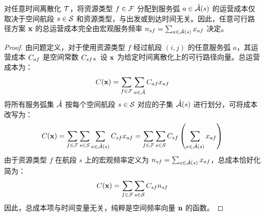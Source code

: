 \begin{lemma}
\label{lem:time_invariance_cost}
对任意时间离散化 $\mathcal{T}$，将资源类型 $f \in \mathcal{F}$ 分配到服务弧 $a \in \hat{\mathcal{A}}(s)$ 的运营成本仅取决于空间航段 $s \in \mathcal{S}$ 和资源类型，与出发或到达时间无关。因此，任意可行路径方案 $\mathbf{x}$ 的总运营成本完全由宏观服务频率 $n_{sf} = \sum_{a \in \hat{\mathcal{A}}(s)} x_{af}$ 决定。
\end{lemma}

\begin{proof}
由问题定义，对于使用资源类型 $f$ 经过航段 $(i,j)$ 的任意服务弧 $a$，其运营成本 $C_{af}$ 是空间常数 $C_{sf}$。设 $\mathbf{x}$ 为给定时间离散化上的可行路径向量。总运营成本为：
\begin{equation*}
    C(\mathbf{x}) = \sum_{f \in \mathcal{F}} \sum_{a \in \hat{\mathcal{A}}} C_{af} x_{af}
\end{equation*}
将所有服务弧集 $\hat{\mathcal{A}}$ 按每个空间航段 $s \in \mathcal{S}$ 对应的子集 $\hat{\mathcal{A}}(s)$ 进行划分，可将成本改写为：
\begin{equation*}
    C(\mathbf{x}) = \sum_{f \in \mathcal{F}} \sum_{s \in \mathcal{S}} \sum_{a \in \hat{\mathcal{A}}(s)} C_{sf} x_{af} = \sum_{f \in \mathcal{F}} \sum_{s \in \mathcal{S}} C_{sf} \left( \sum_{a \in \hat{\mathcal{A}}(s)} x_{af} \right)
\end{equation*}
由于资源类型 $f$ 在航段 $s$ 上的宏观频率定义为 $n_{sf} = \sum_{a \in \hat{\mathcal{A}}(s)} x_{af}$，总成本恰好化简为：
\begin{equation*}
    C(\mathbf{x}) = \sum_{f \in \mathcal{F}} \sum_{s \in \mathcal{S}} C_{sf} n_{sf}
\end{equation*}
因此，总成本项与时间变量无关，纯粹是空间频率向量 $\mathbf{n}$ 的函数。
\end{proof}